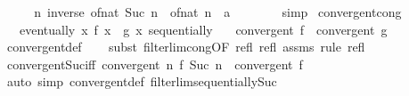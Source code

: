 \begin{isabellebody}
\ \ \isamarkupfalse%
\ \isamarkupfalse%
\ {\isachardoublequoteopen}{\isacharparenleft}{\kern0pt}{\isasymlambda}n{\isachardot}{\kern0pt}\ inverse\ {\isacharparenleft}{\kern0pt}of{\isacharunderscore}{\kern0pt}nat\ {\isacharparenleft}{\kern0pt}Suc\ n{\isacharparenright}{\kern0pt}\ {\isacharslash}{\kern0pt}\ of{\isacharunderscore}{\kern0pt}nat\ n\ {\isacharcolon}{\kern0pt}{\isacharcolon}{\kern0pt}\ {\isacharprime}{\kern0pt}a{\isacharparenright}{\kern0pt}{\isacharparenright}{\kern0pt}\ {\isasymlonglonglongrightarrow}\ {}{\isachardoublequoteclose}\isanewline
\ \ \ \ \isamarkupfalse%
\ simp\isanewline
{}\isamarkupfalse%
%
\endisatagproof
{\isafoldproof}%
%
\isadelimproof
%
\endisadelimproof
%
\isadelimdocument
%
\endisadelimdocument
%
\isatagdocument
%
\isamarkuptrue%
%
\endisatagdocument
{\isafolddocument}%
%
\isadelimdocument
%
\endisadelimdocument
{}\isamarkupfalse%
\ convergent{\isacharunderscore}{\kern0pt}cong{\isacharcolon}{\kern0pt}\isanewline
\ \ \ {\isachardoublequoteopen}eventually\ {\isacharparenleft}{\kern0pt}{\isasymlambda}x{\isachardot}{\kern0pt}\ f\ x\ {\isacharequal}{\kern0pt}\ g\ x{\isacharparenright}{\kern0pt}\ sequentially{\isachardoublequoteclose}\isanewline
\ \ \ {\isachardoublequoteopen}convergent\ f\ {\isasymlongleftrightarrow}\ convergent\ g{\isachardoublequoteclose}\isanewline
%
\isadelimproof
\ \ %
\endisadelimproof
%
\isatagproof
{}\isamarkupfalse%
\ convergent{\isacharunderscore}{\kern0pt}def\isanewline
\ \ \isamarkupfalse%
\ {\isacharparenleft}{\kern0pt}subst\ filterlim{\isacharunderscore}{\kern0pt}cong{\isacharbrackleft}{\kern0pt}OF\ refl\ refl\ assms{\isacharbrackright}{\kern0pt}{\isacharparenright}{\kern0pt}\ {\isacharparenleft}{\kern0pt}rule\ refl{\isacharparenright}{\kern0pt}%
\endisatagproof
{\isafoldproof}%
%
\isadelimproof
\isanewline
%
\endisadelimproof
\isanewline
{}\isamarkupfalse%
\ convergent{\isacharunderscore}{\kern0pt}Suc{\isacharunderscore}{\kern0pt}iff{\isacharcolon}{\kern0pt}\ {\isachardoublequoteopen}convergent\ {\isacharparenleft}{\kern0pt}{\isasymlambda}n{\isachardot}{\kern0pt}\ f\ {\isacharparenleft}{\kern0pt}Suc\ n{\isacharparenright}{\kern0pt}{\isacharparenright}{\kern0pt}\ {\isasymlongleftrightarrow}\ convergent\ f{\isachardoublequoteclose}\isanewline
%
\isadelimproof
\ \ %
\endisadelimproof
%
\isatagproof
{}\isamarkupfalse%
\ {\isacharparenleft}{\kern0pt}auto\ simp{\isacharcolon}{\kern0pt}\ convergent{\isacharunderscore}{\kern0pt}def\ filterlim{\isacharunderscore}{\kern0pt}sequentially{\isacharunderscore}{\kern0pt}Suc{\isacharparenright}{\kern0pt}%

\end{isabellebody}
